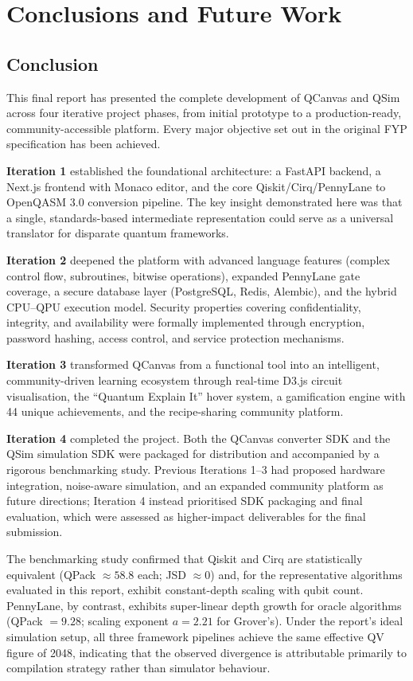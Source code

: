 \chapter{Conclusions and Future Work}
\label{ch:conclusion}

\section{Conclusion}

This final report has presented the complete development of QCanvas and QSim across four iterative project phases, from initial prototype to a production-ready, community-accessible platform. Every major objective set out in the original FYP specification has been achieved.

\textbf{Iteration 1} established the foundational architecture: a FastAPI backend, a Next.js frontend with Monaco editor, and the core Qiskit/Cirq/PennyLane to OpenQASM 3.0 conversion pipeline. The key insight demonstrated here was that a single, standards-based intermediate representation could serve as a universal translator for disparate quantum frameworks.

\textbf{Iteration 2} deepened the platform with advanced language features (complex control flow, subroutines, bitwise operations), expanded PennyLane gate coverage, a secure database layer (PostgreSQL, Redis, Alembic), and the hybrid CPU--QPU execution model. Security properties covering confidentiality, integrity, and availability were formally implemented through encryption, password hashing, access control, and service protection mechanisms.

\textbf{Iteration 3} transformed QCanvas from a functional tool into an intelligent, community-driven learning ecosystem through real-time D3.js circuit visualisation, the ``Quantum Explain It'' hover system, a gamification engine with 44 unique achievements, and the recipe-sharing community platform.

\textbf{Iteration 4} completed the project. Both the QCanvas converter SDK and the QSim simulation SDK were packaged for distribution and accompanied by a rigorous benchmarking study. Previous Iterations 1--3 had proposed hardware integration, noise-aware simulation, and an expanded community platform as future directions; Iteration 4 instead prioritised SDK packaging and final evaluation, which were assessed as higher-impact deliverables for the final submission.

The benchmarking study confirmed that Qiskit and Cirq are statistically equivalent (QPack $\approx 58.8$ each; JSD $\approx 0$) and, for the representative algorithms evaluated in this report, exhibit constant-depth scaling with qubit count. PennyLane, by contrast, exhibits super-linear depth growth for oracle algorithms (QPack $= 9.28$; scaling exponent $a = 2.21$ for Grover's). Under the report's ideal simulation setup, all three framework pipelines achieve the same effective QV figure of 2048, indicating that the observed divergence is attributable primarily to compilation strategy rather than simulator behaviour.


